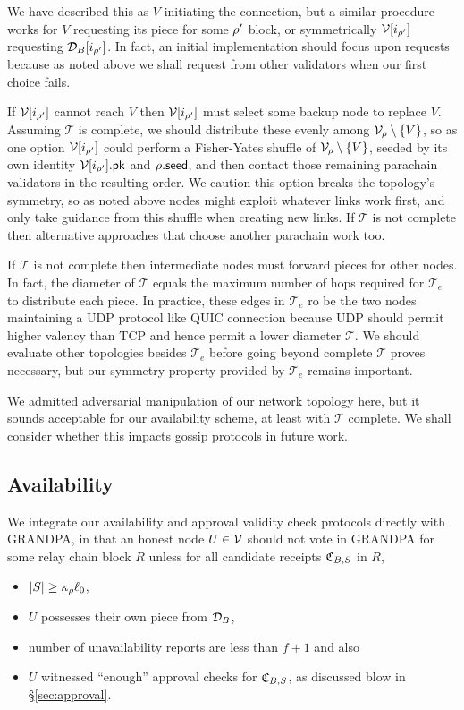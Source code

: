 We have described this as $V$ initiating the connection, but a similar procedure works for $V$ requesting its piece for some $\rho'$ block, or symmetrically $\mathcal{V}[i_{\rho'}]$ requesting $\mathcal{D}_B[i_{\rho'}]$.  In fact, an initial implementation should focus upon requests because as noted above we shall request from other validators when our first choice fails. 

If $\mathcal{V}[i_{\rho'}]$ cannot reach $V$ then $\mathcal{V}[i_{\rho'}]$ must select some backup node to replace $V$.  Assuming $\mathcal{T}$ is complete, we should distribute these evenly among $\mathcal{V}_{\rho} \setminus \{V\}$, so as one option $\mathcal{V}[i_{\rho'}]$ could perform a Fisher-Yates shuffle of $\mathcal{V}_{\rho} \setminus \{V\}$, seeded by its own identity $\mathcal{V}[i_{\rho'}].\mathsf{pk}$ and $\rho.\mathsf{seed}$, and then contact those remaining parachain validators in the resulting order.  We caution this option breaks the topology's symmetry, so as noted above nodes might exploit whatever links work first, and only take guidance from this shuffle when creating new links.  If $\mathcal{T}$ is not complete then alternative approaches that choose another parachain work too.  

If $\mathcal{T}$ is not complete then intermediate nodes must forward pieces for other nodes.  In fact, the diameter of $\mathcal{T}$ equals the maximum number of hops required for $\mathcal{T}_e$ to distribute each piece.  
In practice, these edges in $\mathcal{T}_e$ ro be the two nodes
maintaining a UDP protocol like QUIC connection because UDP should permit higher valency than TCP and hence permit a lower diameter $\mathcal{T}$.  
We should evaluate other topologies besides $\mathcal{T}_e$ before going beyond complete $\mathcal{T}$ proves necessary, but our symmetry property provided by $\mathcal{T}_e$ remains important. 

We admitted adversarial manipulation of our network topology here, but it sounds acceptable for our availability scheme, at least with $\mathcal{T}$ complete.  We shall consider whether this impacts gossip protocols in future work. 


\subsection{Availability} %
\label{sec:availability}

We integrate our availability and approval validity check protocols directly with GRANDPA, in that an honest node $U \in \mathcal{V}$ should not vote in GRANDPA for some relay chain block $R$ unless for all candidate receipts $\mathfrak{C}_{B,S}$ in $R$,
\begin{itemize}
\item $|S| \geq \kappa_{\rho} \ell_0$,
\item $U$ possesses their own piece from $\mathcal{D}_B$,
\item number of unavailability reports are less than  $f+1$ and also
\item $U$ witnessed ``enough'' approval checks for $\mathfrak{C}_{B,S}$,
 as discussed blow in \S\ref{sec:approval}.
\end{itemize}

